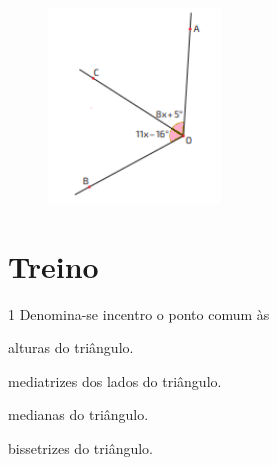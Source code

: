 {{{\begin{escolha}



\item
\begin{figure}[H]
\centering\includegraphics[width=1.80208in,height=2.02917in]{./imgSAEB_8_MAT/media/image34.png}
\end{figure}



\end{escolha}

\section*{Treino}

\num{1} Denomina-se incentro o ponto comum às

\begin{escolha}[itemsep=0pt]
\item alturas do triângulo.
\item mediatrizes dos lados do triângulo.
\item medianas do triângulo.
\item bissetrizes do triângulo. 
\end{escolha}





}}}
